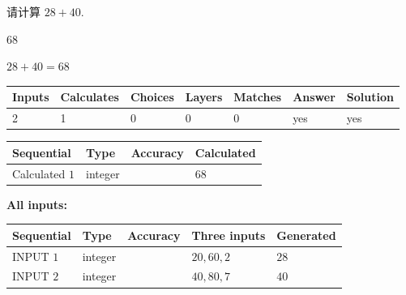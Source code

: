 \documentclass{ctexart}
\begin{document}
  
 
请计算 $ %
28 +  %
40 $.
 
 
 
\noindent{}
 
 

68
 
 
\noindent{}
 
 

 
 
 
\noindent{}
 
 

$ %
28 +  %
40=   %
68$
 
 
\noindent{}
 
 

 
   
   
   
   
\noindent\begin{tabular}{|l|l|l|l|l|l|l|}
 \hline
Inputs & Calculates & Choices & Layers & Matches & Answer & Solution \\ \hline
 2  & 
 1  & 
 0
  & 
 0  & 
 0  & 
  yes & 
  yes 
  \\ \hline
 \end{tabular}
   
   
   
   
\noindent{}
   
   
  
  
\noindent\begin{tabular}{|l|l|l|l|}
\hline
 Sequential & Type & Accuracy & Calculated \\ 
\hline
 
 
  Calculated $  1 $ & integer &  & 
  $ 68 $ 
 \\  \hline  
 \end{tabular}
   
   
   
   
\noindent\vspace{0.1in}\hspace{-0.08in} {\textbf{\Large{All inputs: }}}
   
   
  
  
\noindent\begin{tabular}{|l|l|l|l|l|}
\hline
 Sequential & Type & Accuracy & Three inputs & Generated \\ 
\hline
 
 
  INPUT $  1 $ & integer &  & $
 20
 , 
 60
 , 
 2
 $ & $ 28 $ 
 \\  \hline  
 
 
  INPUT $  2 $ & integer &  & $
 40
 , 
 80
 , 
 7
 $ & $ 40 $ 
 \\  \hline  
 \end{tabular}
   
\end{document}
